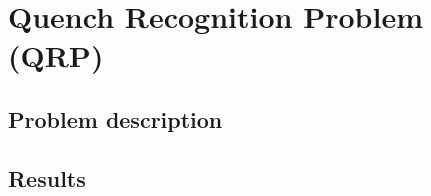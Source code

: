 \chapter{Quench Recognition Problem (QRP)}
\label{chp:qrp}
\section{Problem description}
\section{Results}
